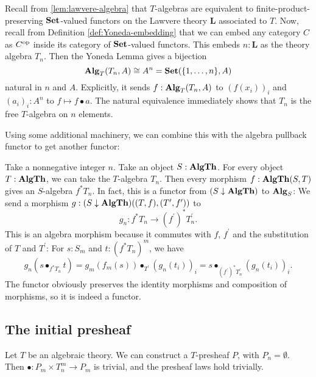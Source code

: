 \begin{remark}
  Recall from \ref{lem:lawvere-algebra} that $ T $-algebras are equivalent to finite-product-preserving $ \mathbf{Set} $-valued functors on the Lawvere theory $ \mathbf L $ associated to $ T $. Now, recall from Definition \ref{def:Yoneda-embedding} that we can embed any category $ C $ as $ C^{\text{op}} $ inside its category of $ \mathbf{Set} $-valued functors. This embeds $ n: \mathbf L $ as the theory algebra $ T_n $. Then the Yoneda Lemma gives a bijection
  \[ \mathbf{Alg}_{T}(T_n, A) \cong A^n = \mathbf{Set}(\{ 1, \dots, n \}, A) \]
  natural in $ n $ and $ A $. Explicitly, it sends $ f: \mathbf{Alg}_{T}(T_n, A) $ to $ (f(x_i))_i $ and $ (a_i)_i : A^n $ to $ f \mapsto f \bullet a $. The natural equivalence immediately shows that $ T_n $ is the free $ T $-algebra on $ n $ elements.
\end{remark}

Using some additional machinery, we can combine this with the algebra pullback functor to get another functor:
\begin{definition}\label{def:theory-algebra-pullback-functor}
  Take a nonnegative integer $ n $. Take an object $ S : \mathbf{AlgTh} $. For every object $ T : \mathbf{AlgTh} $, we can take the $ T $-algebra $ T_n $. Then every morphism $ f: \mathbf{AlgTh}(S, T) $ gives an $ S $-algebra $ f^* T_n $. In fact, this is a functor from $ (S \downarrow \mathbf{AlgTh}) $ to $ \mathbf{Alg}_{S} $: We send a morphism $ g: (S \downarrow \mathbf{AlgTh})((T, f), (T^\prime, f^\prime)) $ to
  \[ g_n: f^* T_n \to (f^\prime)^* T^\prime_n. \]
  This is an algebra morphism because it commutes with $ f $, $ f^\prime $ and the substitution of $ T $ and $ T^\prime $: For $ s: S_m $ and $ t: (f^* T_n)^m $, we have
  \[
      g_n(s \bullet_{f^* T_n} t)
    = g_m(f_m(s)) \bullet_{T^\prime} (g_n(t_i))_i
    = s \bullet_{(f^\prime)^* T^\prime_n} (g_n(t_i))_i.
  \]
  The functor obviously preserves the identity morphisms and composition of morphisms, so it is indeed a functor.
\end{definition}

\subsection{The initial presheaf}
\begin{example}
  Let $ T $ be an algebraic theory. We can construct a $ T $-presheaf $ P $, with $ P_n = \emptyset $. Then $ \bullet : P_m \times T_n^m \to P_m $ is trivial, and the presheaf laws hold trivially.
\end{example}


